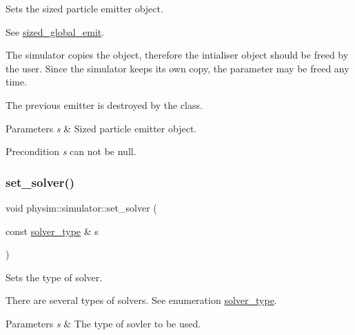 Sets the sized particle emitter object. 

See \hyperlink{classphysim_1_1simulator_a61d4f20480309e95fce1db56b7fc8a88}{sized\+\_\+global\+\_\+emit}.

The simulator copies the object, therefore the intialiser object should be freed by the user. Since the simulator keeps its own copy, the parameter may be freed any time.

The previous emitter is destroyed by the class. 
\begin{DoxyParams}{Parameters}
{\em s} & Sized particle emitter object. \\
\hline
\end{DoxyParams}
\begin{DoxyPrecond}{Precondition}
{\itshape s} can not be null. 
\end{DoxyPrecond}
\mbox{\label{classphysim_1_1simulator_ac0724a6950d7ce81793f8dbeafbfd08a}} 
\subsubsection{\texorpdfstring{set\+\_\+solver()}{set\_solver()}}
{\footnotesize\ttfamily void physim\+::simulator\+::set\+\_\+solver (\begin{DoxyParamCaption}\item[{const \hyperlink{namespacephysim_a09adeda29c09e651877e880d31fc9686}{solver\+\_\+type} \&}]{s }\end{DoxyParamCaption})}



Sets the type of solver. 

There are several types of solvers. See enumeration \hyperlink{namespacephysim_a09adeda29c09e651877e880d31fc9686}{solver\+\_\+type}. 
\begin{DoxyParams}{Parameters}
{\em s} & The type of sovler to be used. \\
\hline
\end{DoxyParams}
\mbox{\label{classphysim_1_1simulator_ab86bf6d22fd222a299183c9d82a71bc1}} 
